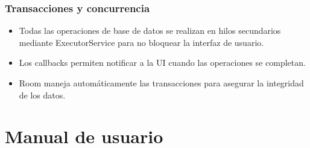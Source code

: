 \documentclass[a4paper,12pt]{report}
\begin{document}
      \subsection{Transacciones y concurrencia}
        \begin{itemize}
          \item Todas las operaciones de base de datos se realizan en hilos secundarios mediante ExecutorService para no bloquear la interfaz de usuario.
          \item Los callbacks permiten notificar a la UI cuando las operaciones se completan.
          \item Room maneja automáticamente las transacciones para asegurar la integridad de los datos.
        \end{itemize}
  \chapter{Manual de usuario}
    \setlength{\intextsep}{2pt}        %
    \setlength{\abovecaptionskip}{1pt}  %
    \setlength{\belowcaptionskip}{1pt}  %
    \setlength{\parskip}{2pt}          %
    \setlength{\topsep}{1pt}           %
\end{document}
